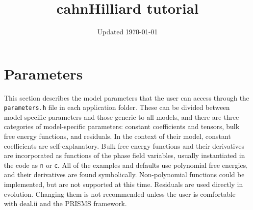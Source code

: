 \documentclass[11pt]{article}
\title{cahnHilliard tutorial}
\date{Updated \today}
\begin{document}
\maketitle


\section{Parameters}
\paragraph{}
This section describes the model parameters that the user can access through the \texttt{parameters.h} file in each application folder.  These can be divided between model-specific parameters and those generic to all models, and there are three categories of model-specific parameters: constant coefficients and tensors, bulk free energy functions, and residuals.  In the context of their model, constant coefficients are self-explanatory.  Bulk free energy functions and their derivatives are incorporated as functions of the phase field variables, usually instantiated in the code as \texttt{n} or \texttt{c}.  All of the examples and defaults use polynomial free energies, and their derivatives are found symbolically.  Non-polynomial functions could be implemented, but are not supported at this time.  Residuals are used directly in evolution.  Changing them is not recommended unless the user is comfortable with deal.ii and the PRISMS framework.
\end{document}
